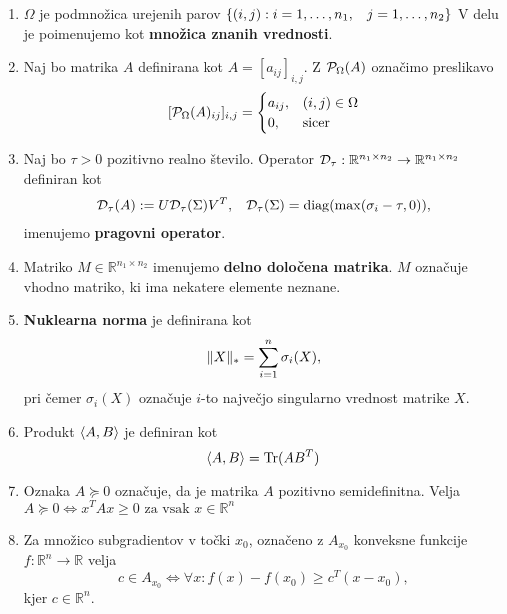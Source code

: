 \begin{enumerate}
  \item $\Omega$ je podmnožica urejenih parov $\{ (i, j) : i = 1, \hdots , n_1, \hspace{0.3cm} j = 1, \hdots, n_2 \}$ V delu je poimenujemo kot \textbf{množica znanih vrednosti}.
  \item Naj bo matrika $A$ definirana kot $A = [a_{ij}]_{i,j}$. Z $\mathcal{P}_\Omega(A)$ označimo preslikavo 
        \[ [\mathcal{P}_\Omega(A)_{ij}]_{i,j} = \begin{cases}
            a_{ij}, & (i, j) \in \Omega \\
            0,      & \text{sicer}
          \end{cases}
        \]
  \item Naj bo $\tau > 0$ pozitivno realno število. Operator $\mathcal{D}_\tau: \mathbb{R}^{n_1 \times n_2} \rightarrow \mathbb{R}^{n_1 \times n_2}$ definiran kot
        \begin{align}
          \label{1007-1959}
          \mathcal{D}_\tau(A) := U \mathcal{D}_\tau(\Sigma) V^T, \hspace{0.3cm} \mathcal{D}_\tau(\Sigma) = \operatorname{diag}(\max(\sigma_i - \tau, 0)),
        \end{align}
        imenujemo \textbf{pragovni operator}. \cite{CCS}
  \item Matriko $M \in \mathbb{R}^{n_1 \times n_2}$ imenujemo \textbf{delno določena matrika}. $M$ označuje vhodno matriko, ki ima nekatere elemente neznane.
  \item \textbf{Nuklearna norma} je definirana kot \[
          \lVert X\rVert_* = \sum_{i = 1}^{n} \sigma_i(X),
        \] pri čemer $\sigma_i(X)$ označuje $i$-to največjo singularno vrednost matrike $X$.
  \item Produkt $\langle A, B \rangle$ je definiran kot \[
          \langle A, B \rangle = \text{Tr}(AB^T)
        \]
  \item Oznaka $A \succeq 0$ označuje, da je matrika $A$ pozitivno semidefinitna. Velja $A \succeq 0 \iff x^TAx \ge 0 \text{ za vsak } x \in \mathbb{R}^n$
  \item Za množico subgradientov v točki $x_0$, označeno z $A_{x_0}$ konveksne funkcije $f: \mathbb{R}^n \rightarrow \mathbb{R}$ velja 
  \[
    c \in A_{x_0} \iff \forall x: f(x) - f(x_0) \geq c^T(x - x_0),
  \] kjer $c \in \mathbb{R}^n$.
\end{enumerate}







